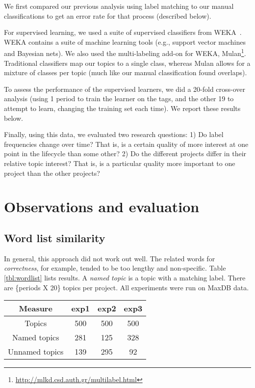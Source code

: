 \documentclass[10pt, conference, compsocconf]{IEEEtran}
\begin{document}
We first compared our previous analysis using label matching to our manual classifications to get an error rate for that process (described below). 

For supervised learning, we used a suite of supervised classifiers from WEKA~\cite{weka09}. WEKA contains a suite of machine learning tools (e.g., support vector machines and Bayesian nets). We also used the multi-labeling add-on for WEKA, Mulan\footnote{\url{http://mlkd.csd.auth.gr/multilabel.html}}. Traditional classifiers map our topics to a single class, whereas Mulan allows for a mixture of classes per topic (much like our manual classification found overlaps). 

To assess the performance of the supervised learners, we did a 20-fold cross-over analysis (using 1 period to train the learner on the tags, and the other 19 to attempt to learn, changing the training set each time). We report these results below.

Finally, using this data, we evaluated two research questions: 1) Do label frequencies change over time? That is, is a certain quality of more interest at one point in the lifecycle than some other? 2) Do the different projects differ in their relative topic interest? That is, is a particular quality more important to one project than the other projects?  

\section{Observations and evaluation}

\subsection{Word list similarity}
In general, this approach did not work out well. The related words for \emph{correctness}, for example, tended to be too lengthy and non-specific. Table \ref{tbl:wordlist} lists results. A \emph{named topic} is a topic with a matching label. There are \{periods X 20\} topics per project. All experiments were run on MaxDB data.

\begin{table*}[h]
	\caption{Automatic topic labeling}
	\centering
	\label{tbl:wordlist}
\begin{tabular}{c|c|c|c}
\toprule
Measure &		 \textsf{exp1} &	 \textsf{exp2} &	 \textsf{exp3} \\
\midrule
Topics &			500		 &			500  	 & 		500  \\
Named topics &		281      &			125      &		328  \\
Unnamed topics &	139      &			295      &      92   \\
\bottomrule
\end{tabular}
\end{table*}
\end{document}
